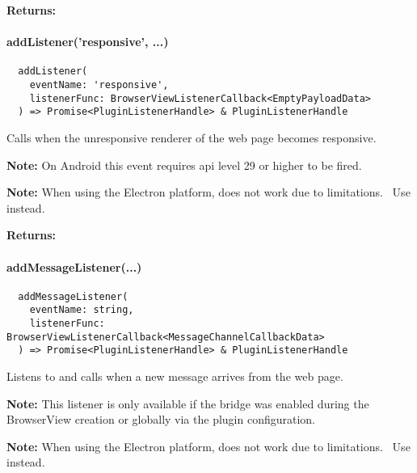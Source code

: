 \textbf{Returns:} 


\paragraph{addListener('responsive', ...)}

\begin{verbatim}
  addListener(
    eventName: 'responsive',
    listenerFunc: BrowserViewListenerCallback<EmptyPayloadData>
  ) => Promise<PluginListenerHandle> & PluginListenerHandle
\end{verbatim}

Calls  when the unresponsive renderer of the web page becomes responsive.

\textbf{Note:} On Android this event requires \ac{api} level 29 or higher to be fired.~\cite{android:api}

\textbf{Note:} When using the Electron platform,  does not work due to limitations.~\cite{capacitor-electron}
Use  instead.

\textbf{Returns:} 


\newpage

\paragraph{addMessageListener(...)}

\begin{verbatim}
  addMessageListener(
    eventName: string,
    listenerFunc: BrowserViewListenerCallback<MessageChannelCallbackData>
  ) => Promise<PluginListenerHandle> & PluginListenerHandle
\end{verbatim}

Listens to  and calls  when a new message arrives from the web page.

\textbf{Note:} This listener is only available if the bridge was enabled during the BrowserView creation or globally via the plugin configuration.

\textbf{Note:} When using the Electron platform,  does not work due to limitations.~\cite{capacitor-electron}
Use  instead.


